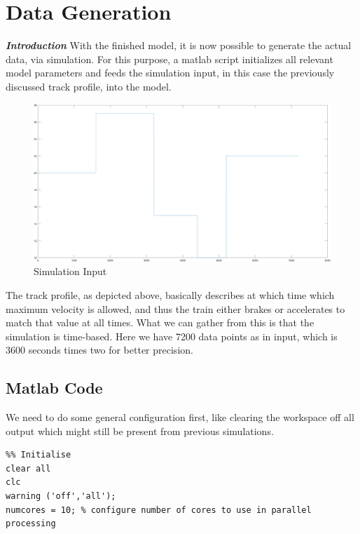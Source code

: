 \chapter{Data Generation}
\label{chap:DataGeneration}
\par\noindent
\emph{\textbf{Introduction}} With the finished model, it is now possible to generate the actual data, via simulation. For this purpose, a matlab script initializes all relevant model parameters and feeds the simulation input, in this case the previously discussed track profile, into the model. 

\begin{figure}[H]
	\centering
	\includegraphics[width=\linewidth]{./pic/input}
	\caption{Simulation Input}
	\label{fig:siminput}
\end{figure}

\par\noindent
The track profile, as depicted above, basically describes at which time which maximum velocity is allowed, and thus the train either brakes or accelerates to match that value at all times. What we can gather from this is that the simulation is time-based. Here we have 7200 data points as in input, which is 3600 seconds times two for better precision.

\section{Matlab Code}
\label{sec:MatlabCode}
\par\noindent
We need to do some general configuration first, like clearing the workspace off all output which might still be present from previous simulations. 

\begin{lstlisting}
%% Initialise
clear all
clc
warning ('off','all');
numcores = 10; % configure number of cores to use in parallel processing
\end{lstlisting}

